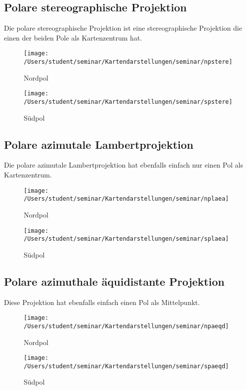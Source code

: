 \subsection{Polare stereographische Projektion}
\label{sec:polstere}
Die polare stereographische  Projektion ist eine stereographische Projektion die einen der beiden Pole als Kartenzentrum hat.\\
\begin{figure}[hbtp]
\centering
\texttt{[image: /Users/student/seminar/Kartendarstellungen/seminar/npstere]} \\
\caption{Nordpol}
\end{figure}
\begin{figure}[hbtp]
\centering
\texttt{[image: /Users/student/seminar/Kartendarstellungen/seminar/spstere]} 
\caption{Südpol}
\end{figure}\newpage 
\subsection{Polare azimutale Lambertprojektion}
\label{sec:pollam}
Die polare  azimutale Lambertprojektion hat ebenfalls einfach nur einen Pol als Kartenzentrum.\\
\begin{figure}[hbtp]
\centering
\texttt{[image: /Users/student/seminar/Kartendarstellungen/seminar/nplaea]}\\
\caption{Nordpol}
\end{figure}
\begin{figure}[hbtp]
\centering
\texttt{[image: /Users/student/seminar/Kartendarstellungen/seminar/splaea]} 
\caption{Südpol}
\end{figure}\newpage 
\subsection{Polare azimuthale äquidistante Projektion}
\label{sec:polaequi}
Diese Projektion hat ebenfalls einfach einen Pol als Mittelpunkt. \\
\begin{figure}[hbtp]
\centering
\texttt{[image: /Users/student/seminar/Kartendarstellungen/seminar/npaeqd]} \\
\caption{Nordpol}
\end{figure}
\begin{figure}[hbtp]
\centering
\texttt{[image: /Users/student/seminar/Kartendarstellungen/seminar/spaeqd]} \caption{Südpol}
\end{figure}\newpage 
